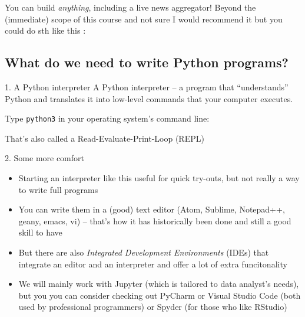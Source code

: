 \begin{frame}{You can build \emph{anything}, including a live news aggregator!} 
	Beyond the (immediate) scope of this course and not sure I would recommend it but you could do sth like this \parencite{3bij3}:
\end{frame}


\begin{frame}[plain]
\end{frame}

\subsection{What do we need to write Python programs?}

\begin{frame}{1. A Python interpreter}
A Python interpreter -- a program that ``understands'' Python and translates it into low-level commands that your computer executes.

Type \texttt{python3} in your operating system's command line:

That's also called a Read-Evaluate-Print-Loop (REPL)
\end{frame}

\begin{frame}{2. Some more comfort}
\begin{itemize}[<+->]
	\item Starting an interpreter like this useful for quick try-outs, but not really a way to write full programs
	\item You can write them in a (good) text editor (Atom, Sublime, Notepad++, geany, emacs, vi) -- that's how it has historically been done and still a good skill to have
	\item But there are also \emph{Integrated Development Environments} (IDEs) that integrate an editor and an interpreter and offer a lot of extra funcitonality
	\item We will mainly work with Jupyter (which is tailored to data analyst's needs), but you you can consider checking out PyCharm or Visual Studio Code (both used by professional programmers) or Spyder (for those who like RStudio)
\end{itemize}
\end{frame}

